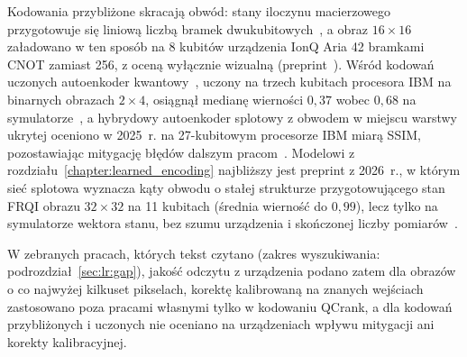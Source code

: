 Kodowania przybliżone skracają obwód: stany iloczynu macierzowego przygotowuje się liniową liczbą bramek dwukubitowych~\cite{jobst_efficient_2024}, a obraz $16\times16$ załadowano w ten sposób na 8 kubitów urządzenia IonQ Aria 42 bramkami CNOT zamiast 256, z oceną wyłącznie wizualną (preprint~\cite{iaconis_tensor_2023}).
Wśród kodowań uczonych autoenkoder kwantowy~\cite{romero_quantum_2017}, uczony na trzech kubitach procesora IBM na binarnych obrazach $2\times4$, osiągnął medianę wierności $0{,}37$ wobec $0{,}68$ na symulatorze~\cite{patel_information_2023}, a hybrydowy autoenkoder splotowy z obwodem w miejscu warstwy ukrytej oceniono w 2025~r. na 27-kubitowym procesorze IBM miarą SSIM, pozostawiając mitygację błędów dalszym pracom~\cite{kit_enhancing_2025}.
Modelowi z rozdziału~\ref{chapter:learned_encoding} najbliższy jest preprint z 2026~r., w którym sieć splotowa wyznacza kąty obwodu o stałej strukturze przygotowującego stan FRQI obrazu $32\times32$ na 11 kubitach (średnia wierność do $0{,}99$), lecz tylko na symulatorze wektora stanu, bez szumu urządzenia i skończonej liczby pomiarów~\cite{aoun_quantum_2026}.

W zebranych pracach, których tekst czytano (zakres wyszukiwania: podrozdział~\ref{sec:lr:gap}), jakość odczytu z urządzenia podano zatem dla obrazów o co najwyżej kilkuset pikselach, korektę kalibrowaną na znanych wejściach zastosowano poza pracami własnymi tylko w kodowaniu QCrank, a dla kodowań przybliżonych i uczonych nie oceniano na urządzeniach wpływu mitygacji ani korekty kalibracyjnej.
